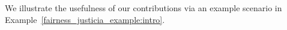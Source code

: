 We illustrate the usefulness of our contributions via an example scenario in Example~\ref{fairness_justicia_example:intro}.




